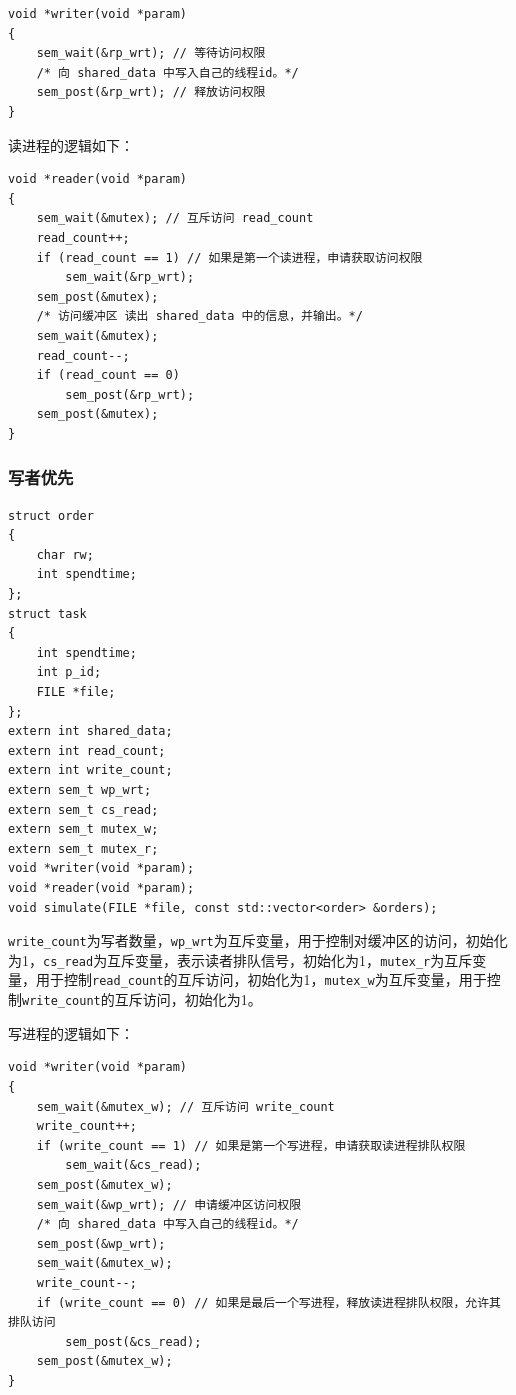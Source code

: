 \documentclass[lang=cn,11pt,a4paper,cite=authornum]{paper}
\begin{document}
\begin{code}
\begin{verbatim}
void *writer(void *param)
{
    sem_wait(&rp_wrt); // 等待访问权限
    /* 向 shared_data 中写入自己的线程id。*/
    sem_post(&rp_wrt); // 释放访问权限
}
\end{verbatim}
\end{code}

读进程的逻辑如下：

\begin{code}
\begin{verbatim}
void *reader(void *param)
{
    sem_wait(&mutex); // 互斥访问 read_count
    read_count++;
    if (read_count == 1) // 如果是第一个读进程，申请获取访问权限
        sem_wait(&rp_wrt);
    sem_post(&mutex);
    /* 访问缓冲区 读出 shared_data 中的信息，并输出。*/
    sem_wait(&mutex);
    read_count--;
    if (read_count == 0)
        sem_post(&rp_wrt);
    sem_post(&mutex);
}
\end{verbatim}
\end{code}

\subsubsection{写者优先}

\begin{code}
\begin{verbatim}
struct order
{
    char rw;
    int spendtime;
};
struct task
{
    int spendtime;
    int p_id;
    FILE *file;
};
extern int shared_data;
extern int read_count;
extern int write_count;
extern sem_t wp_wrt;
extern sem_t cs_read;
extern sem_t mutex_w;
extern sem_t mutex_r;
void *writer(void *param);
void *reader(void *param);
void simulate(FILE *file, const std::vector<order> &orders);
\end{verbatim}
\end{code}

\texttt{write_count}为写者数量，\texttt{wp_wrt}为互斥变量，用于控制对缓冲区的访问，初始化为1，\texttt{cs_read}为互斥变量，表示读者排队信号，初始化为1，\texttt{mutex_r}为互斥变量，用于控制\texttt{read_count}的互斥访问，初始化为1，\texttt{mutex_w}为互斥变量，用于控制\texttt{write_count}的互斥访问，初始化为1。

写进程的逻辑如下：

\begin{code}
\begin{verbatim}
void *writer(void *param)
{
    sem_wait(&mutex_w); // 互斥访问 write_count
    write_count++;
    if (write_count == 1) // 如果是第一个写进程，申请获取读进程排队权限
        sem_wait(&cs_read);
    sem_post(&mutex_w);
    sem_wait(&wp_wrt); // 申请缓冲区访问权限
    /* 向 shared_data 中写入自己的线程id。*/
    sem_post(&wp_wrt);
    sem_wait(&mutex_w);
    write_count--;
    if (write_count == 0) // 如果是最后一个写进程，释放读进程排队权限，允许其排队访问
        sem_post(&cs_read);
    sem_post(&mutex_w);
}
\end{verbatim}
\end{code}
\end{document}

